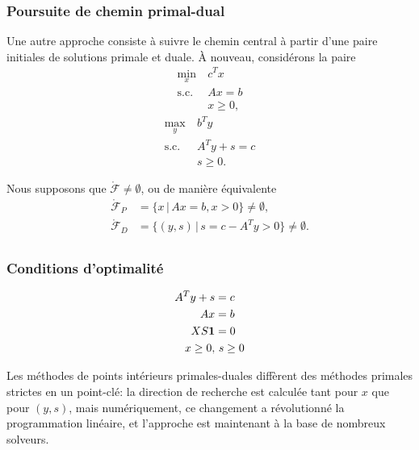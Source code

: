 \documentclass[usepdftitle=false, aspectratio=169]{beamer}
\begin{document}
\begin{frame}
\frametitle{Poursuite de chemin primal-dual}

Une autre approche consiste à suivre le chemin central à partir d'une paire initiales de solutions primale et duale.
À nouveau, considérons la paire
\begin{equation}
\begin{aligned}
\min_x\ & c^T x \\
\mbox{s.c. } & Ax = b \\
& x \geq 0,
\end{aligned}
\tag{P}
\end{equation}
\begin{equation}
\begin{aligned}
\max_y \  & b^T y \\
\mbox{s.c. } & A^T y + s = c \\
& s \geq 0.
\end{aligned}
\tag{D}
\end{equation}

Nous supposons que $\mathring{\mathcal{F}} \ne \emptyset$, ou de manière équivalente
\begin{align*}
	\mathring{\mathcal{F}}_P &= \lbrace x \,|\, Ax = b, x > 0 \rbrace \ne \emptyset, \\
	\mathring{\mathcal{F}}_D &= \lbrace (y,s) \,|\, s = c-A^Ty > 0 \rbrace \ne \emptyset. \\
\end{align*}

\end{frame}

\begin{frame}
\frametitle{Conditions d'optimalité}

\begin{align*}
A^T y + s &= c \\
Ax &= b \\
XS{\boldsymbol{1}} &= 0 \\
x \geq 0,&\ s \geq 0
\end{align*}

\mbox{}

Les méthodes de points intérieurs primales-duales diffèrent des méthodes primales strictes en un point-clé: la direction de recherche est calculée tant pour $x$ que pour $(y,s)$, mais numériquement, ce changement a révolutionné la programmation linéaire, et l'approche est maintenant à la base de nombreux solveurs.

\end{frame}
\end{document}
